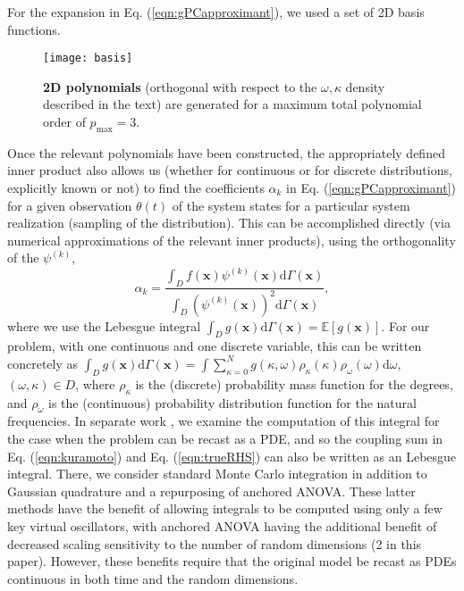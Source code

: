 \documentclass[numbers]{frontiersSCNS}
\renewcommand{\vec}[1]{\bm{#1}}
\newcommand{\diff}{\mathrm{d}}  %
\newcommand{\degree}{\kappa}
\newcommand{\numNodes}{{N}}
\newcommand{\basisFuncSymbol}{\psi}
\newcommand{\basisFunc}[1]{\basisFuncSymbol^{(#1)}}
\newcommand{\xMeasure}{\Gamma}
\newcommand{\diffMeasureVec}{{\diff \xMeasure(\vec x)}}
\newcommand{\intD}{{\int_D}}
\newcommand{\eqnRef}[1]{Eq. (\ref{eqn:#1})}
\newcommand{\scalarFuncIndex}{k}
\begin{document}
For the expansion in \eqnRef{gPCapproximant},
we used a set of 2D basis functions.
%
%
\setcounter{subfigure}{0}\begin{figure}[ht]
\centering
%
\texttt{[image: basis]}
\caption[Orthogonal $2D$ Polynomials]{
    \textbf{2D polynomials} (orthogonal with respect to the $\omega,\degree$ density 
    described in the text) are generated
    for a maximum total polynomial order of $p_\text{max}=3$.
}
\label{fig:2dPolyGrid}
\end{figure}
%
%
Once the relevant polynomials have been constructed, the appropriately defined inner product
also allows us (whether for continuous or for discrete distributions,
explicitly known or not)
to find the coefficients $\alpha_{\scalarFuncIndex}$ in \eqnRef{gPCapproximant}
for a given observation $\theta(t)$ of the system states
for a particular system realization (sampling of the distribution).
%
This can be accomplished directly (via numerical approximations of the
relevant inner products), using the orthogonality of the $\basisFunc{\scalarFuncIndex}$,
\begin{equation}
    \label{eqn:galerkinCoeffs}
    \alpha_{\scalarFuncIndex} = \frac{
        \intD{} f(\vec x) \basisFunc{\scalarFuncIndex}(\vec x) \diffMeasureVec
    }{
        \intD{} (\basisFunc{\scalarFuncIndex}(\vec x))^2 \diffMeasureVec
    },
\end{equation}
where we use the Lebesgue integral $\intD{} g(\vec x) \diffMeasureVec=\mathbb E[g(\vec x)]$.
%
For our problem, with one continuous and one discrete variable,
this can be written concretely as
$\intD{} g(\vec x) \diffMeasureVec
=
\int \sum_{\degree=0}^{\numNodes} g(\degree, \omega)
\rho_\degree(\degree)
\rho_\omega(\omega)
\diff \omega
$,
$(\omega, \degree)\in D$,
where $\rho_\degree$ is the (discrete) probability mass function for the degrees,
and $\rho_\omega$ is the (continuous) probability distribution function for the natural frequencies.
%
In separate work \cite{Choi2016}, we examine the computation of this integral
for the case when the problem can be recast as a PDE,
and so the coupling sum in \eqnRef{kuramoto} and \eqnRef{trueRHS}
can also be written as an Lebesgue integral.
%
There, we consider standard Monte Carlo integration
in addition to Gaussian quadrature and a repurposing of anchored ANOVA.
%
These latter methods have the benefit of allowing integrals to be computed
using only a few key virtual oscillators,
with anchored ANOVA having the additional benefit of decreased scaling sensitivity
to the number of random dimensions (2 in this paper).
%
However, these benefits require that the original model be recast as PDEs
continuous in both time and the random dimensions.
\end{document}
